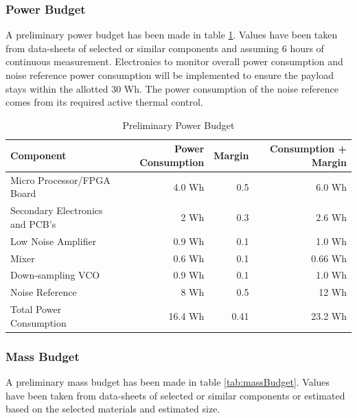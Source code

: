 \documentclass[12pt]{article}
\begin{document}
\subsubsection{Power Budget}

A preliminary power budget has been made in table \ref{tab:powerBudget}. Values have been taken from data-sheets of selected or similar components and assuming 6 hours of continuous measurement. Electronics to monitor overall power consumption and noise reference power consumption will be implemented to ensure the payload stays within the allotted 30 Wh. The power consumption of the noise reference comes from its required active thermal control. 

\begin{table}[H]
	\centering
	\vspace{0.5cm}
	\renewcommand{\arraystretch}{1.3}
	\caption{Preliminary Power Budget}
	\label{tab:powerBudget}
	\begin{tabularx}{\textwidth}{lrrr}
		\toprule
		Component & Power Consumption & Margin & Consumption + Margin \\		
		\midrule
		Micro Processor/FPGA Board			&4.0 Wh & 0.5 & 6.0 Wh \\ 
		Secondary Electronics and PCB's		&2 Wh & 0.3 & 2.6 Wh \\
		Low Noise Amplifier					&0.9 Wh & 0.1 & 1.0 Wh \\ 
		Mixer						 		&0.6 Wh & 0.1 & 0.66 Wh \\ 
		Down-sampling VCO			 		&0.9 Wh & 0.1 & 1.0 Wh \\ 
		Noise Reference						&8 Wh & 0.5 & 12 Wh \\ \midrule
		Total Power Consumption				&16.4 Wh & 0.41 & 23.2 Wh
	\end{tabularx}	
\end{table}

\subsubsection{Mass Budget}

A preliminary mass budget has been made in table \ref{tab:massBudget}. Values have been taken from data-sheets of selected or similar components or estimated based on the selected materials and estimated size. 
\end{document}
